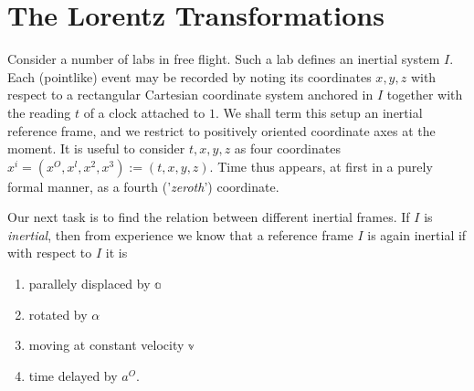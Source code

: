 \section{The Lorentz Transformations}
Consider a number of labs in free flight. Such a lab defines
an inertial system $ I $. Each (pointlike) event may be recorded by noting its coordinates $ x, y, z $ with respect to a rectangular Cartesian coordinate system anchored in $ I $ together with the reading $ t $ of a clock attached to $ 1 $. We shall term this setup an inertial reference frame, and we restrict to positively oriented coordinate axes at the moment.
It is useful to consider $ t,x,y,z $ as four coordinates $ x^i = (x^O,x^l,x^2,x^3):= (t,x,y,z) $.
Time thus appears, at first in a purely formal manner, as a fourth ('\emph{zeroth}') coordinate.

Our next task is to find the relation between different inertial frames. If $ I $ is \emph{inertial}, then from experience we know that a reference frame $ I $ is again inertial if with respect to $ I $ it is 
\begin{enumerate}
	\item parallely displaced by $ \mathbb{a} $
	\item rotated by $ \mathbb{\alpha} $
	\item moving at constant velocity $ \mathbb{v} $
	\item time delayed by $ a^O $.
\end{enumerate}
